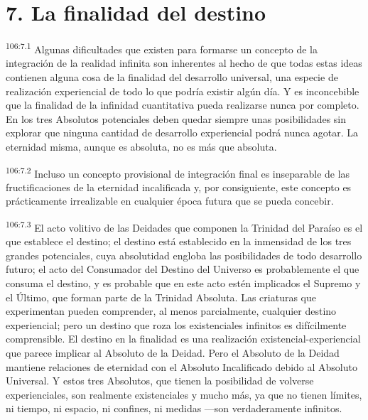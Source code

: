 \section*{7. La finalidad del destino}
\par
\textsuperscript{106:7.1} Algunas dificultades que existen para formarse un concepto de la integración de la realidad infinita son inherentes al hecho de que todas estas ideas contienen alguna cosa de la finalidad del desarrollo universal, una especie de realización experiencial de todo lo que podría existir algún día. Y es inconcebible que la finalidad de la infinidad cuantitativa pueda realizarse nunca por completo. En los tres Absolutos potenciales deben quedar siempre unas posibilidades sin explorar que ninguna cantidad de desarrollo experiencial podrá nunca agotar. La eternidad misma, aunque es absoluta, no es más que absoluta.

\par
\textsuperscript{106:7.2} Incluso un concepto provisional de integración final es inseparable de las fructificaciones de la eternidad incalificada y, por consiguiente, este concepto es prácticamente irrealizable en cualquier época futura que se pueda concebir.

\par
\textsuperscript{106:7.3} El acto volitivo de las Deidades que componen la Trinidad del Paraíso es el que establece el destino; el destino está establecido en la inmensidad de los tres grandes potenciales, cuya absolutidad engloba las posibilidades de todo desarrollo futuro; el acto del Consumador del Destino del Universo es probablemente el que consuma el destino, y es probable que en este acto estén implicados el Supremo y el Último, que forman parte de la Trinidad Absoluta. Las criaturas que experimentan pueden comprender, al menos parcialmente, cualquier destino experiencial; pero un destino que roza los existenciales infinitos es difícilmente comprensible. El destino en la finalidad es una realización existencial-experiencial que parece implicar al Absoluto de la Deidad. Pero el Absoluto de la Deidad mantiene relaciones de eternidad con el Absoluto Incalificado debido al Absoluto Universal. Y estos tres Absolutos, que tienen la posibilidad de volverse experienciales, son realmente existenciales y mucho más, ya que no tienen límites, ni tiempo, ni espacio, ni confines, ni medidas ---son verdaderamente infinitos.

